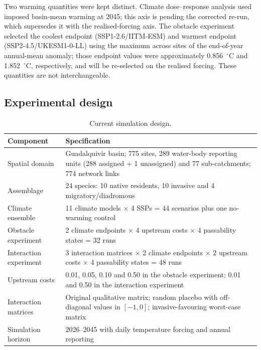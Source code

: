 \documentclass[11pt,a4paper]{article}
\begin{document}
Two warming quantities were kept distinct. Climate dose--response analysis used imposed basin-mean warming at 2045; this axis is pending the corrected re-run, which supersedes it with the realised-forcing axis. The obstacle experiment selected the coolest endpoint (SSP1-2.6/IITM-ESM) and warmest endpoint (SSP2-4.5/UKESM1-0-LL) using the maximum across sites of the end-of-year annual-mean anomaly; those endpoint values were approximately 0.856~$^\circ$C and 1.852~$^\circ$C, respectively, and will be re-selected on the realised forcing. These quantities are not interchangeable.

\subsection{Experimental design}

\begin{table}[H]
\centering
\caption{Current simulation design.}
\small
\begin{tabularx}{\textwidth}{>{\raggedright\arraybackslash}p{}Y}
\toprule
Component & Specification \\
\midrule
Spatial domain & Guadalquivir basin; 775 sites, 289 water-body reporting units (288 assigned + 1 unassigned) and 77 sub-catchments; 774 network links \\
Assemblage & 24 species: 10 native residents, 10 invasive and 4 migratory/diadromous \\
Climate ensemble & 11 climate models $\times$ 4 SSPs = 44 scenarios plus one no-warming control \\
Obstacle experiment & 2 climate endpoints $\times$ 4 upstream costs $\times$ 4 passability states = 32 runs \\
Interaction experiment & 3 interaction matrices $\times$ 2 climate endpoints $\times$ 2 upstream costs $\times$ 4 passability states = 48 runs \\
Upstream costs & 0.01, 0.05, 0.10 and 0.50 in the obstacle experiment; 0.01 and 0.50 in the interaction experiment \\
Interaction matrices & Original qualitative matrix; random placebo with off-diagonal values in $[-1,0]$; invasive-favouring worst-case matrix \\
Simulation horizon & 2026--2045 with daily temperature forcing and annual reporting \\
\bottomrule
\end{tabularx}
\end{table}
\end{document}
